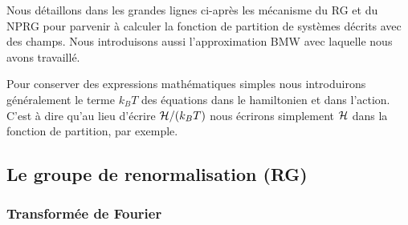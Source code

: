 \documentclass[10.5pt]{article}
\begin{document}
\begin{multicols*}{2}
\label{sec:RGGeneral}

Nous détaillons dans les grandes lignes ci-après les mécanisme du RG et du NPRG pour parvenir à calculer la fonction de partition de systèmes décrits avec des champs. Nous introduisons aussi l'approximation BMW avec laquelle nous avons travaillé.

Pour conserver des expressions mathématiques simples nous introduirons généralement le terme $k_B T$ des équations dans le hamiltonien et dans l'action. C'est à dire qu'au lieu d'écrire $\mathcal{H}/(k_BT)$ nous écrirons simplement $\mathcal{H}$ dans la fonction de partition, par exemple.


\subsection{Le groupe de renormalisation (RG)}
\subsubsection{Transformée de Fourier}

\label{sec:TF}


\end{multicols*}
\end{document}
